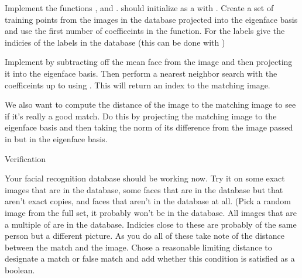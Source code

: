 \begin{problem}
Implement the functions , and .
 should initialize  as a  with .
Create a set of training points from the images in the database projected into the eigenface basis and use the first  number of coefficeints in the  function.
For the labels give the indicies of the labels in the database (this can be done with )

Implement  by subtracting off the mean face from the image and then projecting it into the eigenface basis.
Then perform a nearest neighbor search with the coefficeints up to  using .
This will return an index to the matching image.

We also want to compute the distance of the image to the matching image to see if it's really a good match.
Do this by projecting the matching image to the eigenface basis and then taking the norm of its difference from the image passed in but in the eigenface basis.
\end{problem}

\begin{problem}
Verification

Your facial recognition database should be working now.
Try it on some exact images that are in the database, some faces that are in the database but that aren't exact copies, and faces that aren't in the database at all.
(Pick a random image from the full set, it probably won't be in the database.
 All images that are a multiple of  are in the database.
 Indicies close to these are probably of the same person but a different picture.
 As you do all of these take note of the distance between the match and the image.
 Chose a reasonable limiting distance to designate a match or false match and add whether this condition is satisfied as a boolean.
\end{problem} 